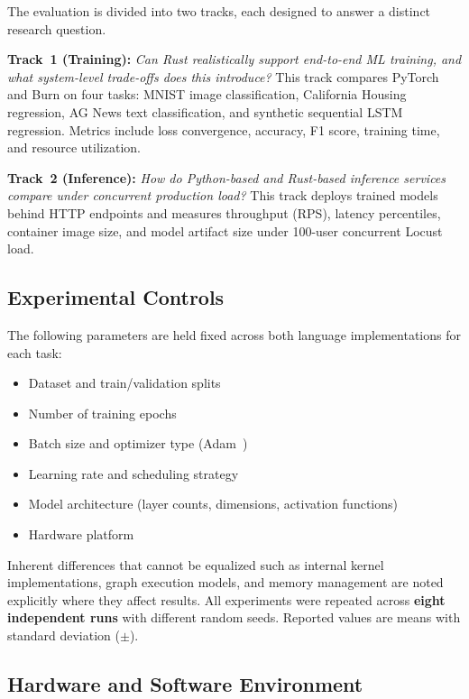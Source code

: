 \documentclass{ieeeaccess}
\begin{document}
The evaluation is divided into two tracks, each designed to answer a distinct research question.

\textbf{Track~1 (Training):} \textit{Can Rust realistically support end-to-end ML training, and what system-level trade-offs does this introduce?} This track compares PyTorch and Burn on four tasks: MNIST image classification, California Housing regression, AG News text classification, and synthetic sequential LSTM regression. Metrics include loss convergence, accuracy, F1 score, training time, and resource utilization.

\textbf{Track~2 (Inference):} \textit{How do Python-based and Rust-based inference services compare under concurrent production load?} This track deploys trained models behind HTTP endpoints and measures throughput (RPS), latency percentiles, container image size, and model artifact size under 100-user concurrent Locust load.

\subsection{Experimental Controls}

The following parameters are held fixed across both language implementations for each task:
\begin{itemize}
    \item Dataset and train/validation splits
    \item Number of training epochs
    \item Batch size and optimizer type (Adam~\cite{kingma2015adam})
    \item Learning rate and scheduling strategy
    \item Model architecture (layer counts, dimensions, activation functions)
    \item Hardware platform
\end{itemize}

Inherent differences that cannot be equalized such as internal kernel implementations, graph execution models, and memory management are noted explicitly where they affect results. All experiments were repeated across \textbf{eight independent runs} with different random seeds. Reported values are means with standard deviation ($\pm$).

\subsection{Hardware and Software Environment}
\end{document}
